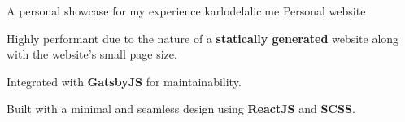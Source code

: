 \begin{cventries}

\cventry
{A personal showcase for my experience} %
{karlodelalic.me \href{https://github.com/kdelalic/karlodelalic.com-gatsby}{\faGithub}} %
{Personal website}
{}
{ %
\begin{cvitems}
\item {Highly performant due to the nature of a \textbf{statically generated} website along with the website's small page size.}
\item {Integrated with \textbf{GatsbyJS} for maintainability.}
\item {Built with a minimal and seamless design using \textbf{ReactJS} and \textbf{SCSS}.}
\end{cvitems}
}


\end{cventries}